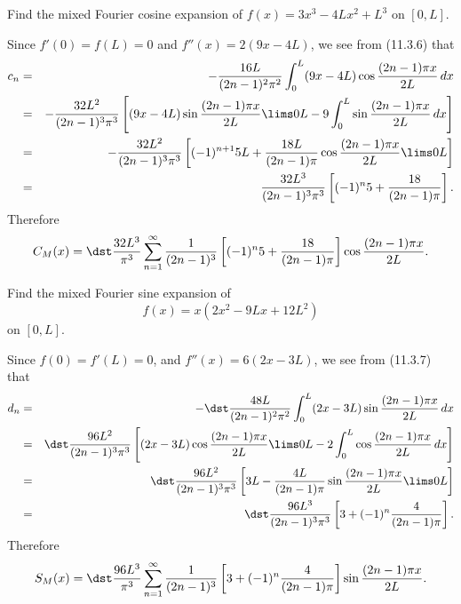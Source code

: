 \setcounter{example}{6}
\begin{example}
  \label{example:11.3.7} \rm Find the mixed Fourier cosine expansion of $f(x)=3x^{3}-4Lx^{2}+L^{3}$
  on $[0,L]$.
\end{example}
\begin{examplesolution}
\solution Since $f'(0)=f(L)=0$ and $f''(x)=2(9x-4L)$, we see from (11.3.6) that
\begin{eqnarray*}
  c_{n} & = & -\frac{16L}{(2n-1)^{2}\pi^{2}}\int_{0}^{L}(9x-4L)\cos\frac{(2n-1)\pi x}{2L}\,dx                                                     \\
        & = & -\frac{32L^{2}}{(2n-1)^{3}\pi^{3}}\left[(9x-4L)\sin\frac{(2n-1)\pi x}{2L}\lims0L-9\int_{0}^{L}\sin\frac{(2n-1)\pi x}{2L}\,dx\right] \\
        & = & -\frac{32L^{2}}{(2n-1)^{3}\pi^{3}}\left[(-1)^{n+1}5L+\frac{18L}{(2n-1)\pi}\cos\frac{(2n-1)\pi x}{2L}\lims0L\right]                  \\
        & = & \frac{32L^{3}}{(2n-1)^{3}\pi^{3}}\left[(-1)^{n}5+\frac{18}{(2n-1)\pi}\right].
\end{eqnarray*}
Therefore
\[
  C_{M}(x)=\dst\frac{32L^{3}}{\pi^{3}}\sum_{n=1}^{\infty}\frac{1}{(2n-1)^{3}}\left[ (-1)^{n}5+\frac{18}{(2n-1)\pi}\right]\cos\frac{(2n-1)\pi x}{2L}.
\]
\end{examplesolution}

\setcounter{example}{7}
\begin{example}
  \label{example:11.3.8} \rm Find the mixed Fourier sine expansion of
  \[
    f(x)=x(2x^{2}-9Lx+12L^{2})
  \]
  on $[0,L]$.
\end{example}
\begin{examplesolution}
\solution Since $f(0)=f'(L)=0$, and $f''(x)=6(2x-3L)$, we see from (11.3.7) that
\begin{eqnarray*}
  d_{n} & = & -\dst\frac{48L}{(2n-1)^{2}\pi^{2}}\int_{0}^{L}(2x-3L)\sin\frac{(2n-1)\pi x}{2L}\,dx                                                    \\
        & = & \dst\frac{96L^{2}}{(2n-1)^{3}\pi^{3}}\left[(2x-3L)\cos\frac{(2n-1)\pi x}{2L}\lims0L-2\int_{0}^{L}\cos\frac{(2n-1)\pi x}{2L}\,dx\right] \\
        & = & \dst\frac{96L^{2}}{(2n-1)^{3}\pi^{3}}\left[3L-\frac{4L}{(2n-1)\pi}\sin\frac{(2n-1)\pi x}{2L}\lims0L\right]                             \\
        & = & \dst\frac{96L^{3}}{(2n-1)^{3}\pi^{3}}\left[3+(-1)^{n}\frac{4}{(2n-1)\pi}\right].
\end{eqnarray*}
Therefore
\[
  S_{M}(x) =\dst\frac{96L^{3}}{\pi^{3}}\sum_{n=1}^{\infty}\frac{1}{(2n-1)^{3}}\left[3+(-1)^{n}\frac{4}{(2n-1)\pi}\right]\sin\frac{(2n-1)\pi x}{2L}.
\]
\end{examplesolution}

